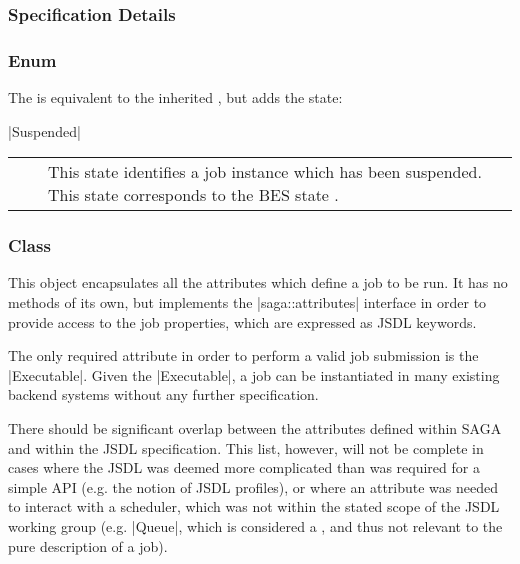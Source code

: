  
 \subsubsection{Specification Details}
 
  \subsubsection*{Enum }
 
    The  is equivalent to the inherited
    , but adds the  state:
 
    |Suspended|\\[1.5mm]
    \begin{tabular}{cp{110mm}}
       ~~ & This state identifies a job  instance which 
            has been suspended.  This state corresponds to the 
            BES state \T{'Suspend'}.
    \end{tabular}
 
 
  \subsubsection*{Class }
 
    This object encapsulates all the attributes which define a
    job to be run. It has no methods of its own, but implements
    the |saga::attributes| interface in order to provide access
    to the job properties, which are expressed as JSDL keywords. 
    
    The only required attribute in order to perform a valid job
    submission is the |Executable|. Given the |Executable|, a
    job can be instantiated in many existing backend
    systems without any further specification.
 
    There should be significant overlap between the
    attributes defined within SAGA and within the JSDL
    specification. This list, however, will not be complete in
    cases where the JSDL was deemed more complicated than was
    required for a simple API (e.g. the notion of JSDL
    profiles), or where an attribute was needed to
    interact with a scheduler, which was not within the stated
    scope of the JSDL working group (e.g.  |Queue|, which is
    considered a , and thus not relevant to
    the pure description of a job).
 
